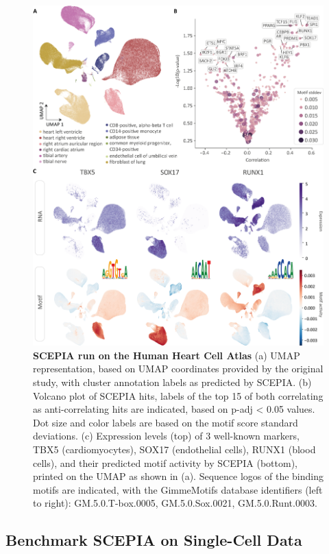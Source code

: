 \begin{figure}
    \centering
    \includegraphics[width=0.75\linewidth]{ch.scepia/imgs/SCEPIA_allCells_Fig1_v9.png}
    \caption{\textbf{SCEPIA run on the Human Heart Cell Atlas} (a) UMAP representation, based on UMAP coordinates provided by the original study\cite{Kanemaru2023}, with cluster annotation labels as predicted by SCEPIA. (b) Volcano plot of SCEPIA hits, labels of the top 15 of both correlating as anti-correlating hits are indicated, based on p-adj < 0.05 values. Dot size and color labels are based on the motif score standard deviations.  (c) Expression levels (top) of 3 well-known markers, TBX5 (cardiomyocytes), SOX17 (endothelial cells), RUNX1 (blood cells), and their predicted motif activity by SCEPIA (bottom), printed on the UMAP as shown in (a). Sequence logos of the binding motifs are indicated, with the GimmeMotifs database identifiers (left to right): GM.5.0.T-box.0005, GM.5.0.Sox.0021, GM.5.0.Runt.0003. }
    \label{fig:scepia_hhca1}
\end{figure}

\subsection{Benchmark SCEPIA on Single-Cell Data}

